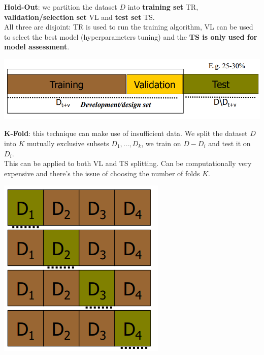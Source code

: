 \documentclass[10pt]{report}
\begin{document}
\begin{list}{}{}
	\item \textbf{Hold-Out}: we partition the dataset $D$ into \textbf{training set} TR, \textbf{validation/selection set} VL and \textbf{test set} TS.\\
	All three are disjoint: TR is used to run the training algorithm, VL can be used to select the best model (hyperparameters tuning) and the \textbf{TS is only used for model assessment}.
	\begin{center}
		\includegraphics[scale=0.5]{2.png}
	\end{center}
	\item \begin{multicols}{2}
	\textbf{K-Fold}: this technique can make use of insufficient data. We split the dataset $D$ into $K$ mutually exclusive subsets $D_1,\ldots, D_k$, we train on $D - D_i$ and test it on $D_i$.\\
	This can be applied to both VL and TS splitting. Can be computationally very expensive and there's the issue of choosing the number of folds $K$.
	\begin{center}
		\includegraphics[scale=0.5]{3.png}
	\end{center}
	\end{multicols}
\end{list}
\end{document}
